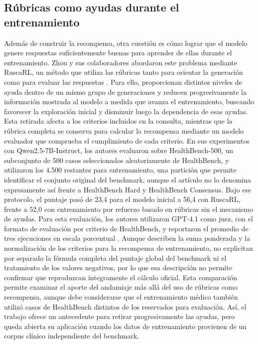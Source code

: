 \subsection{Rúbricas como ayudas durante el entrenamiento}
Además de construir la recompensa, otra cuestión es cómo lograr que el modelo genere respuestas suficientemente buenas para aprender de ellas durante el entrenamiento. Zhou y sus colaboradores abordaron este problema mediante RuscaRL, un método que utiliza las rúbricas tanto para orientar la generación como para evaluar las respuestas \cite{zhou2026ruscarl}. Para ello, proporcionan distintos niveles de ayuda dentro de un mismo grupo de generaciones y reducen progresivamente la información mostrada al modelo a medida que avanza el entrenamiento, buscando favorecer la exploración inicial y disminuir luego la dependencia de esas ayudas. Esta retirada afecta a los criterios incluidos en la consulta, mientras que la rúbrica completa se conserva para calcular la recompensa mediante un modelo evaluador que comprueba el cumplimiento de cada criterio. En sus experimentos con Qwen2.5-7B-Instruct, los autores evaluaron sobre HealthBench-500, un subconjunto de 500 casos seleccionados aleatoriamente de HealthBench, y utilizaron los 4.500 restantes para entrenamiento, una partición que permite identificar el conjunto original del benchmark, aunque el artículo no lo denomina expresamente así frente a HealthBench Hard y HealthBench Consensus. Bajo ese protocolo, el puntaje pasó de 23,4 para el modelo inicial a 56,4 con RuscaRL, frente a 52,0 con entrenamiento por refuerzo basado en rúbricas sin el mecanismo de ayudas. Para esta evaluación, los autores utilizaron GPT-4.1 como juez, con el formato de evaluación por criterio de HealthBench, y reportaron el promedio de tres ejecuciones en escala porcentual \cite{zhou2026ruscarl}. Aunque describen la suma ponderada y la normalización de los criterios para la recompensa de entrenamiento, no explicitan por separado la fórmula completa del puntaje global del benchmark ni el tratamiento de los valores negativos, por lo que esa descripción no permite confirmar que reproduzcan íntegramente el cálculo oficial. Esta comparación permite examinar el aporte del andamiaje más allá del uso de rúbricas como recompensa, aunque debe considerarse que el entrenamiento médico también utilizó casos de HealthBench distintos de los reservados para evaluación. Así, el trabajo ofrece un antecedente para retirar progresivamente las ayudas, pero queda abierta su aplicación cuando los datos de entrenamiento provienen de un corpus clínico independiente del benchmark.

